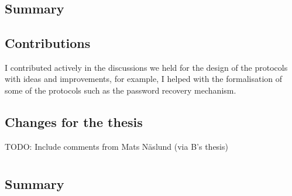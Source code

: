 

\section{}
\begingroup\centering
\begin{ppBox}
\end{ppBox}
\endgroup

\subsection{Summary}



\subsection{Contributions}
    \label{subsection:contributions-p2p}
I contributed actively in the discussions we held for the design of the protocols 
with ideas and improvements, for example, I helped with the formalisation of some 
of the protocols such as the password recovery mechanism. 

\subsection{Changes for the thesis}
TODO: Include comments from Mats Näslund (via B's thesis)

\section{}
\begingroup\centering
\begin{ppBox}
\end{ppBox}
\endgroup

\subsection{Summary}


